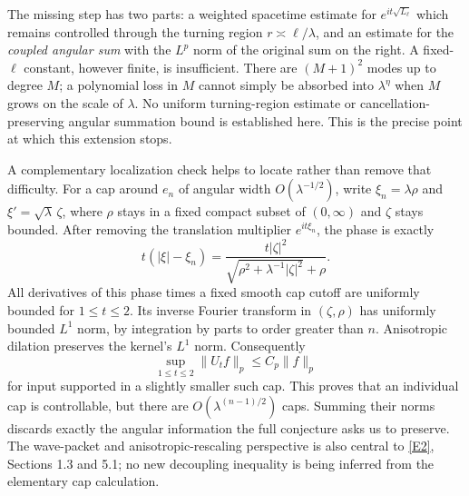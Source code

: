 \documentclass[11pt]{article}
\newcommand{\eref}[2]{\hyperlink{extra:#1:#2}{[E#2]}}
\begin{document}
	The missing step has two parts: a weighted spacetime estimate for
	$e^{it\sqrt{L_\ell}}$ which remains controlled through the turning region
	$r\asymp\ell/\lambda$, and an estimate for the \emph{coupled angular sum}
	with the $L^p$ norm of the original sum on the right. A fixed-$\ell$
	constant, however finite, is insufficient. There are $(M+1)^2$ modes up
	to degree $M$; a polynomial loss in $M$ cannot simply be absorbed into
	$\lambda^\eta$ when $M$ grows on the scale of $\lambda$. No uniform
	turning-region estimate or cancellation-preserving angular summation
	bound is established here. This is the precise point at which this
	extension stops.
	
	A complementary localization check helps to locate rather than remove
	that difficulty. For a cap around $e_n$ of angular width
	$O(\lambda^{-1/2})$, write $\xi_n=\lambda\rho$ and
	$\xi'=\sqrt\lambda\,\zeta$, where $\rho$ stays in a fixed compact
	subset of $(0,\infty)$ and $\zeta$ stays bounded. After removing the
	translation multiplier $e^{it\xi_n}$, the phase is exactly
	\begin{equation}\label{ra201:capphase}
		t(|\xi|-\xi_n)=
		\frac{t|\zeta|^2}{\sqrt{\rho^2+\lambda^{-1}|\zeta|^2}+\rho}.
	\end{equation}
	All derivatives of this phase times a fixed smooth cap cutoff are
	uniformly bounded for $1\leq t\leq2$. Its inverse Fourier transform in
	$(\zeta,\rho)$ has uniformly bounded $L^1$ norm, by integration by
	parts to order greater than $n$. Anisotropic dilation preserves the
	kernel's $L^1$ norm. Consequently
	\[
	\sup_{1\leq t\leq2}\|U_tf\|_p\leq C_p\|f\|_p
	\]
	for input supported in a slightly smaller such cap. This proves that
	an individual cap is controllable, but there are
	$O(\lambda^{(n-1)/2})$ caps. Summing their norms discards exactly the
	angular information the full conjecture asks us to preserve. The
	wave-packet and anisotropic-rescaling perspective is also central to
	\eref{201}{2}, Sections 1.3 and 5.1; no new decoupling inequality is
	being inferred from the elementary cap calculation.
	
\end{document}
